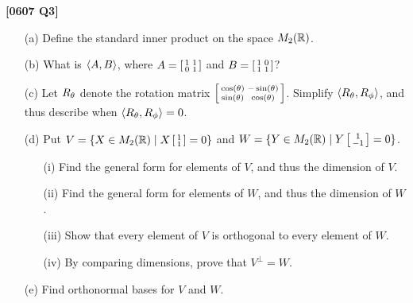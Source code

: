 \documentclass[a4paper]{article}
\begin{document}
\begin{problem}\textbf{[0607 Q3]}
 \begin{itemize}
  \item[(a)] Define the standard inner product on the space
   $M_2({\mathbb{R}})$. 
  \item[(b)] What is $\langle A,B\rangle$, where $A=\left[\begin{smallmatrix} 1&1\\0&1\end{smallmatrix}\right]$
   and $B=\left[\begin{smallmatrix} 1&0\\1&1\end{smallmatrix}\right]$? 
  \item[(c)] Let $R_\theta$ denote the rotation matrix
   $\left[\begin{smallmatrix}\cos(\theta)&-\sin(\theta)\\ \sin(\theta)&\cos(\theta)\end{smallmatrix}\right]$.  Simplify
   $\langle R_\theta,R_\phi\rangle$, and thus describe when
   $\langle R_\theta,R_\phi\rangle=0$.  
  \item[(d)] Put $V=\{X\in M_2({\mathbb{R}})\;|\; X\left[\begin{smallmatrix} 1\\1\end{smallmatrix}\right] =0\}$ and 
   $W=\{Y\in M_2({\mathbb{R}})\;|\; Y\left[\begin{smallmatrix} 1\\-1\end{smallmatrix}\right] =0\}$.
   \begin{itemize}
    \item[(i)] Find the general form for elements of $V$, and thus the
     dimension of $V$.
    \item[(ii)] Find the general form for elements of $W$, and thus the
     dimension of $W$.
    \item[(iii)] Show that every element of $V$ is orthogonal to every
     element of $W$.
    \item[(iv)] By comparing dimensions, prove that $V^\perp=W$.
   \end{itemize}
  \item[(e)] Find orthonormal bases for $V$ and $W$. 
 \end{itemize}
\end{problem}
\end{document}
